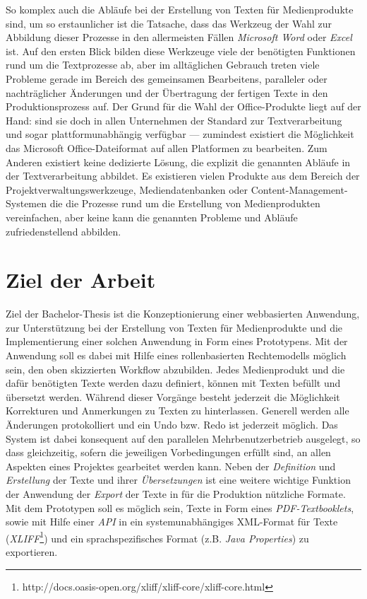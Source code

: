 \documentclass[11pt,a4paper]{article}
\begin{document}
So komplex auch die Abläufe bei der Erstellung von Texten für Medienprodukte sind, um so erstaunlicher ist die Tatsache, dass das Werkzeug der Wahl zur Abbildung dieser Prozesse in den allermeisten Fällen \emph{Microsoft Word} oder \emph{Excel} ist. Auf den ersten Blick bilden diese Werkzeuge viele der benötigten Funktionen rund um die Textprozesse ab, aber im alltäglichen Gebrauch treten viele Probleme gerade im Bereich des gemeinsamen Bearbeitens, paralleler oder nachträglicher Änderungen und der Übertragung der fertigen Texte in den Produktionsprozess auf. Der Grund für die Wahl der Office-Produkte liegt auf der Hand: sind sie doch in allen Unternehmen der Standard zur Textverarbeitung und sogar plattformunabhängig verfügbar --- zumindest existiert die Möglichkeit das Microsoft Office-Dateiformat auf allen Platformen zu bearbeiten. Zum Anderen existiert keine dedizierte Lösung, die explizit die genannten Abläufe in der Textverarbeitung abbildet. Es existieren vielen Produkte aus dem Bereich der Projektverwaltungswerkzeuge, Mediendatenbanken oder Content-Management-Systemen die die Prozesse rund um die Erstellung von Medienprodukten vereinfachen, aber keine kann die genannten Probleme und Abläufe zufriedenstellend abbilden.

\section*{Ziel der Arbeit}

Ziel der Bachelor-Thesis ist die Konzeptionierung einer webbasierten Anwendung, zur Unterstützung bei der Erstellung von Texten für Medienprodukte und die Implementierung einer solchen Anwendung in Form eines Prototypens. Mit der Anwendung soll es dabei mit Hilfe eines rollenbasierten Rechtemodells möglich sein, den oben skizzierten Workflow abzubilden. Jedes Medienprodukt und die dafür benötigten Texte werden dazu definiert, können mit Texten befüllt und übersetzt werden. Während dieser Vorgänge besteht jederzeit die Möglichkeit Korrekturen und Anmerkungen zu Texten zu hinterlassen. Generell werden alle Änderungen protokolliert und ein Undo bzw. Redo ist jederzeit möglich. Das System ist dabei konsequent auf den parallelen Mehrbenutzerbetrieb ausgelegt, so dass gleichzeitig, sofern die jeweiligen Vorbedingungen erfüllt sind, an allen Aspekten eines Projektes gearbeitet werden kann. Neben der \emph{Definition} und \emph{Erstellung} der Texte und ihrer \emph{Übersetzungen} ist eine weitere wichtige Funktion der Anwendung der \emph{Export} der Texte in für die Produktion nützliche Formate. Mit dem Prototypen soll es möglich sein, Texte in Form eines \emph{PDF-Textbooklets}, sowie mit Hilfe einer \emph{API} in ein systemunabhängiges XML-Format für Texte (\emph{XLIFF}\footnote{http://docs.oasis-open.org/xliff/xliff-core/xliff-core.html}) und ein sprachspezifisches Format (z.B. \emph{Java Properties}) zu exportieren. 
\end{document}
